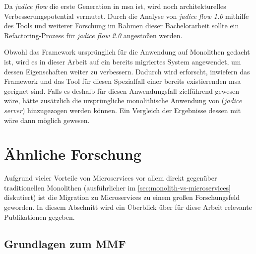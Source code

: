 Da \emph{jadice flow} die erste Generation in \acrlong{msa} ist, wird noch architekturelles Verbesserungspotential vermutet.
Durch die Analyse von \emph{jadice flow 1.0} mithilfe des Tools und weiterer Forschung im Rahmen dieser Bachelorarbeit sollte ein Refactoring-Prozess für \emph{jadice flow 2.0} angestoßen werden.

Obwohl das Framework ursprünglich für die Anwendung auf Monolithen gedacht ist, wird es in dieser Arbeit auf ein bereits migriertes System angewendet, um dessen Eigenschaften weiter zu verbessern.
Dadurch wird erforscht, inwiefern das Framework und das Tool für diesen Spezialfall einer bereits existierenden \acrlong{msa} geeignet sind.
Falls es deshalb für diesen Anwendungsfall zielführend gewesen wäre, hätte zusätzlich die ursprüngliche monolithische Anwendung von \jf (\emph{jadice server}) hinzugezogen werden können.
Ein Vergleich der Ergebnisse dessen mit \jf wäre dann möglich gewesen.

\section{Ähnliche Forschung}

Aufgrund vieler Vorteile von Microservices vor allem direkt gegenüber traditionellen Monolithen (ausführlicher im \cref{sec:monolith-vs-microservices} diskutiert) ist die Migration zu Microservices zu einem großen Forschungsfeld geworden.
In diesem Abschnitt wird ein Überblick über für diese Arbeit relevante Publikationen gegeben.

\subsection{Grundlagen zum MMF}


